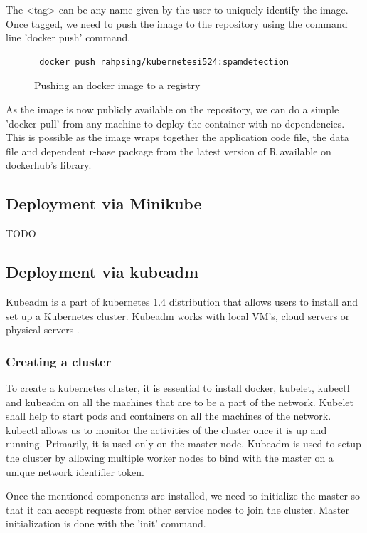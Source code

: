 \documentclass[9pt,twocolumn,twoside]{../../styles/osajnl}
\begin{document}
The <tag> can be any name given by the user to uniquely identify the
image. Once tagged, we need to push the image to the repository using
the command line 'docker push' command.

\begin{figure}[H]
\begin{verbatim}
 docker push rahpsing/kubernetesi524:spamdetection
\end{verbatim}
\caption{Pushing an docker image to a registry}
\label{Pushing an docker image to a registry}
\end{figure}

As the image is now publicly available on the repository, we can do a
simple 'docker pull' from any machine to deploy the container with no
dependencies. This is possible as the image wraps together the
application code file, the data file and dependent r-base package from
the latest version of R available on dockerhub's library.


\subsection{Deployment via Minikube}
TODO

\subsection{Deployment via kubeadm}

Kubeadm is a part of kubernetes 1.4 distribution that allows users to
install and set up a Kubernetes cluster. Kubeadm works with local
VM's, cloud servers or physical servers \cite{www-kubernetes-kubeadm}.

\subsubsection{Creating a cluster}
To create a kubernetes cluster, it is essential to install docker,
kubelet, kubectl and kubeadm on all the machines that are to be a part
of the network. Kubelet shall help to start pods and containers on all
the machines of the network.  kubectl allows us to monitor the
activities of the cluster once it is up and running. Primarily, it is
used only on the master node. Kubeadm is used to setup the cluster by
allowing multiple worker nodes to bind with the master on a unique
network identifier token.

Once the mentioned components are installed, we need to initialize the
master so that it can accept requests from other service nodes to join
the cluster. Master initialization is done with the 'init' command.
\end{document}
